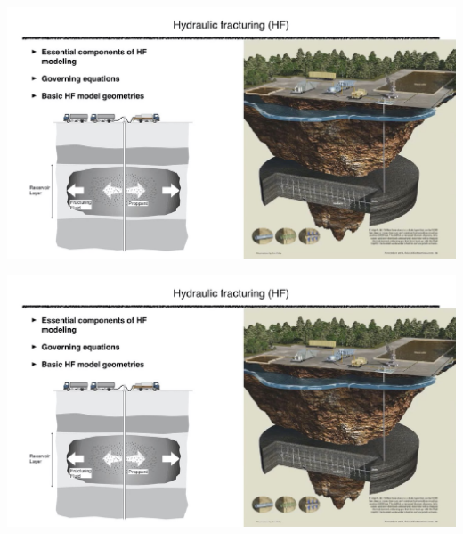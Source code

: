 \documentclass[main.tex]{subfiles}
\begin{document}
\includegraphics[width=\textwidth, page=71]{HF_slides.pdf}

\includegraphics[width=\textwidth, page=72]{HF_slides.pdf}
\end{document}

